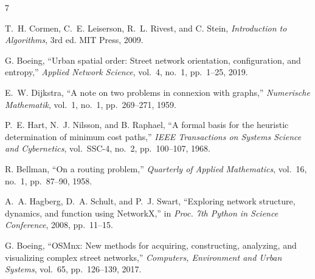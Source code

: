 \documentclass[conference]{IEEEtran}
\begin{document}
\begin{thebibliography}{7}

T.~H. Cormen, C.~E. Leiserson, R.~L. Rivest, and C. Stein, \emph{Introduction to Algorithms}, 3rd ed. MIT Press, 2009.

G. Boeing, ``Urban spatial order: Street network orientation, configuration, and entropy,'' \emph{Applied Network Science}, vol.~4, no.~1, pp.~1--25, 2019.

E.~W. Dijkstra, ``A note on two problems in connexion with graphs,'' \emph{Numerische Mathematik}, vol.~1, no.~1, pp.~269--271, 1959.

P.~E. Hart, N.~J. Nilsson, and B. Raphael, ``A formal basis for the heuristic determination of minimum cost paths,'' \emph{IEEE Transactions on Systems Science and Cybernetics}, vol.~SSC-4, no.~2, pp.~100--107, 1968.

R. Bellman, ``On a routing problem,'' \emph{Quarterly of Applied Mathematics}, vol.~16, no.~1, pp.~87--90, 1958.

A.~A. Hagberg, D.~A. Schult, and P.~J. Swart, ``Exploring network structure, dynamics, and function using NetworkX,'' in \emph{Proc. 7th Python in Science Conference}, 2008, pp.~11--15.

G. Boeing, ``OSMnx: New methods for acquiring, constructing, analyzing, and visualizing complex street networks,'' \emph{Computers, Environment and Urban Systems}, vol.~65, pp.~126--139, 2017.

\end{thebibliography}
\end{document}
